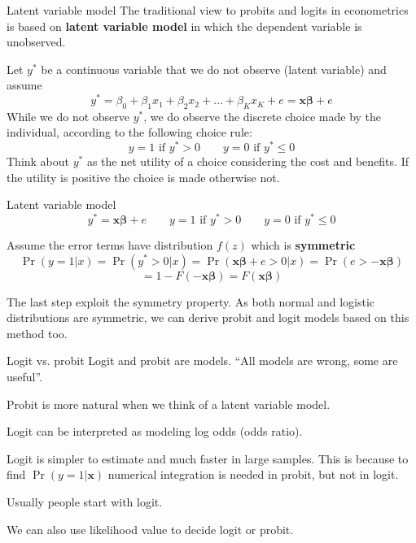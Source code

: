 \documentclass{beamer}
\begin{document}
\begin{frame}{Latent variable model}
The traditional view to probits and logits in econometrics is based on \textbf{latent variable model} in which the dependent variable is unobserved.\bigskip

Let $y^*$ be a continuous variable that we do not observe (latent variable) and assume 
\[y^* =\beta_0+\beta_1x_1 +\beta_2x_2 + \dots + \beta_Kx_K + e=\mathbf{x\beta}+e  \]
While we do not observe $y^*$, we do observe the discrete choice made by the individual, according to the following choice rule:
\[y = 1 \text{ if } y^*> 0 \qquad y = 0 \text{ if } y^* \le 0\]
Think about $y^*$ as the net utility of a choice considering the cost and benefits. If the utility is positive the choice is made otherwise not.
\end{frame}

\begin{frame}{Latent variable model}
\[y^* =\mathbf{x\beta}+e \qquad y = 1 \text{ if } y^*> 0 \qquad y = 0 \text{ if } y^* \le 0 \]\bigskip

Assume the error terms have distribution $f(z)$ which is \textbf{symmetric}
\[\Pr(y=1|x)=\Pr(y^*>0|x)=\Pr(\mathbf{x\beta}+e>0|x)=\Pr(e>-\mathbf{x\beta}) \]
\[= 1-F(-\mathbf{x\beta})=F(\mathbf{x\beta}) \]

The last step exploit the symmetry property. As both normal and logistic distributions are symmetric, we can derive probit and logit models based on this method too.
\end{frame}

\begin{frame}{Logit vs. probit}
Logit and probit are models. ``All models are wrong, some are useful''.\bigskip

Probit is more natural when we think of a latent variable model.\bigskip

Logit can be interpreted as modeling log odds (odds ratio).\bigskip 

Logit is simpler to estimate and much faster in large samples. This is because to find $\Pr(y=1|\mathbf{x})$ numerical integration is needed in probit, but not in logit.\bigskip

Usually people start with logit. \bigskip

We can also use likelihood value to decide logit or probit.

\end{frame}
\end{document}
